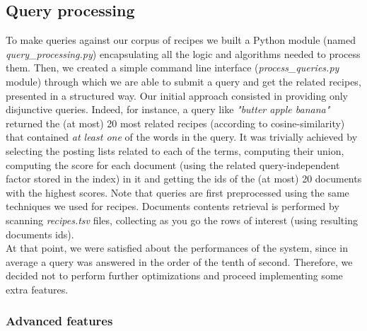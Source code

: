 \subsection{Query processing}

To make queries against our corpus of recipes we built a Python module (named \textit{query\_processing.py}) encapsulating all the logic and algorithms needed to process them. Then, we created a simple command line interface (\textit{process\_queries.py} module) through which we are able to submit a query and get the related recipes, presented in a structured way.
Our initial approach consisted in providing only disjunctive queries. Indeed, for instance, a query like \textit{"butter apple banana"} returned the (at most) 20 most related recipes (according to cosine-similarity) that contained \textit{at least one} of the words in the query. It was trivially achieved by selecting the posting lists related to each of the terms, computing their union, computing the score for each document (using the related query-independent factor stored in the index) in it and getting the ids of the (at most) 20 documents with the highest scores. Note that queries are first preprocessed using the same techniques we used for recipes. Documents contents retrieval is performed by scanning \textit{recipes.tsv} files, collecting as you go the rows of interest (using resulting documents ids).\\
At that point, we were satisfied about the performances of the system, since in average a query was answered in the order of the tenth of second. Therefore, we decided not to perform further optimizations and proceed implementing some extra features.


\subsubsection{Advanced features}

